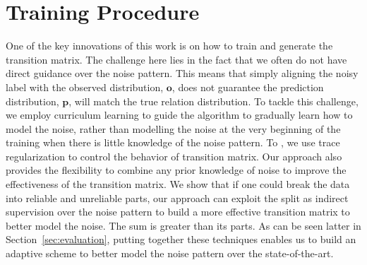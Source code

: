 \section{Training Procedure \label{sec:training}}
One of the key innovations of this work is on how to train and generate the
transition matrix. The challenge here lies in the fact that we often do not
have direct guidance over the noise pattern. This means that simply aligning
the noisy label with the observed distribution, $\mathbf{o}$, does not
guarantee the prediction distribution, $\mathbf{p}$, will match the true
relation distribution. To tackle this challenge, we employ curriculum
learning to guide the algorithm to gradually learn how to model the noise,
rather than modelling the noise at the very beginning of the training when
there is little knowledge of the noise pattern. To , we use  trace regularization
to control the behavior of transition matrix. Our approach also provides the
flexibility to combine any prior knowledge of noise to improve the
effectiveness of  the transition matrix. We show that if one could break the
data into reliable and unreliable parts, our approach can exploit the split
as indirect supervision over the noise pattern to build a more effective
transition matrix to better model the noise. The sum is greater than its
parts. As can be seen latter in Section~\ref{sec:evaluation}, putting
together these techniques
enables us to build an adaptive scheme to better model the noise pattern over the state-of-the-art. 





